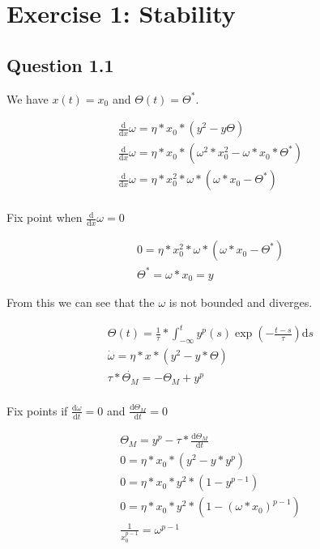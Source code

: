 %
%


% 


\newpage

\section{Exercise 1: Stability }

\subsection{Question 1.1}

We have $x(t) = x_0$ and $ \Theta(t) = \Theta^*$.

\begin{align*}
	\frac{\mathrm d}{\mathrm d x} \omega = \eta * x_0 * (y^2 - y \Theta) \\
	\frac{\mathrm d}{\mathrm d x} \omega = \eta * x_0 * (\omega^2 * x_0^2 - \omega* x_0 * \Theta^*) \\
	\frac{\mathrm d}{\mathrm d x} \omega = \eta * x_0^2 * \omega * (\omega * x_0 - \Theta^*) \\
\end{align*}


Fix point when $\frac{\mathrm d}{\mathrm d x} \omega = 0$

\begin{align*}
	0 = \eta * x_0^2 * \omega * (\omega * x_0 - \Theta^*) \\
	\Theta^* = \omega * x_0 = y
\end{align*}

From this we can see that the $\omega$ is not bounded and diverges.

\begin{align*}
	\Theta(t) = \frac{1}{\tau} * \int_{-\infty}^{t} y^p (s)\exp(-\frac{t-s}{\tau}) \mathrm{d}s \\
	\dot{\omega} = \eta * x * (y^2 - y * \Theta) \\
	\tau * \dot{\Theta_M} = - \Theta_M + y^p \\
\end{align*}

Fix points if $\frac{\mathrm{d}\omega}{\mathrm{d}t} = 0$ and $\frac{\mathrm{d}\Theta_M}{\mathrm{d}t} = 0$

\begin{align*}
	\Theta_M = y^p - \tau * \frac{\mathrm{d}\Theta_M}{\mathrm{d}t} \\
	0 = \eta * x_0 * (y^2 - y * y^p) \\
	0 = \eta * x_0 * y^2 *(1-y^{p-1}) \\
	0 = \eta * x_0 * y^2 *(1-(\omega*x_0)^{p-1}) \\
	\frac{1}{x_0^{p-1}} = \omega^{p-1} \\
\end{align*}


